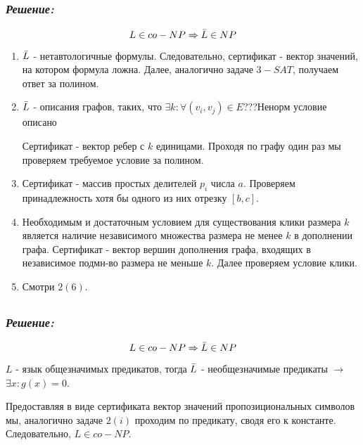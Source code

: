 \documentclass[a4paper, 12pt]{article}
\newcommand*\circled[1]{\tikz[baseline=(char.base)]{
            \node[shape=circle,draw,inner sep=2pt] (char) {#1};}}
\begin{document}
\subsection*{\circled{3}} 
\subsubsection*{\textit{Решение:}}

\[L \in co-NP \Rightarrow \Bar{L} \in NP\]
\begin{enumerate}

\item $\Bar{L}$ - нетавтологичные формулы. Следовательно, сертификат - вектор значений, на котором формула ложна. Далее, аналогично задаче $3-SAT$, получаем ответ за полином.

\item $\Bar{L}$ - описания графов, таких, что $\exists k: \forall (v_i, v_j) \in E $???Ненорм условие описано

Сертификат - вектор ребер с $k$ единицами. Проходя по графу один раз мы проверяем требуемое условие за полином.

\item Сертификат - массив простых делителей $p_i$ числа $a$. Проверяем принадлежность хотя бы одного из них отрезку $[b, c]$.

\item Необходимым и достаточным условием для существования клики размера $k$ является наличие независимого множества размера не менее $k$ в дополнении графа. Сертификат - вектор вершин дополнения графа, входящих в независимое подмн-во размера не меньше $k$. Далее проверяем условие клики.

\item Смотри $2(6)$.

\end{enumerate}
\subsection*{\circled{4}} 
\subsubsection*{\textit{Решение:}}

\[L \in co-NP \Rightarrow \Bar{L} \in NP\]

$L$ - язык общезначимых предикатов, тогда $\Bar{L}$ - необщезначимые предикаты $\to$ $\exists x: g(x) = 0$.

Предоставляя в виде сертификата вектор значений пропозициональных символов мы, аналогично задаче $2(i)$ проходим по предикату, сводя его к константе. Следовательно, $L \in co-NP$.
\end{document}
